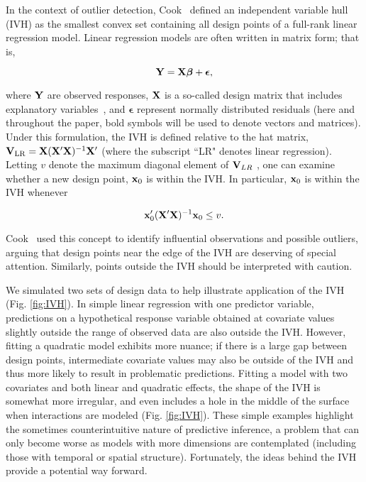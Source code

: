 \documentclass[10pt,letterpaper]{article}
\providecommand{\DIFadd}[1]{{\protect\color{blue}\uwave{#1}}} %
\providecommand{\DIFaddbegin}{} %
\providecommand{\DIFaddend}{} %
\begin{document}
In the context of outlier detection, Cook~\cite{Cook1979} defined an independent variable hull (IVH) as the smallest convex set containing all design points of a full-rank linear regression model.  Linear regression models are often written in matrix form; that is,
\begin{linenomath*}
\begin{equation*}
  {\bf Y} = {\bf X} \boldsymbol{\beta} + \boldsymbol{\epsilon},
\end{equation*}
\end{linenomath*}
where ${\bf Y}$ are observed responses, ${\bf X}$ is a so-called design matrix that includes explanatory variables~\cite{Draper1966}, and $\boldsymbol{\epsilon}$ represent normally distributed residuals (here and throughout the paper, bold symbols will be used to denote vectors and matrices).
Under this formulation, the IVH is defined relative to the hat matrix, ${\bf V}_{\rm LR}={\bf X}({\bf X}^\prime{\bf X})^{-1}{\bf X}^\prime$ (where the subscript ``LR" denotes linear regression).  Letting $v$ denote the maximum diagonal element of ${\bf V}_{LR}$ \DIFaddbegin \DIFadd{(i.e. $v = \max(\textrm{diag}({\bf V}_{LR}))$)}\DIFaddend , one can examine whether a new design point, ${\bf x}_0$ is within the IVH.  In particular, ${\bf x}_0$ is within the IVH whenever
\begin{linenomath*}
\begin{equation}
  \label{eq:IVH}
  {\bf x}_0^\prime ({\bf X}^\prime{\bf X})^{-1}{\bf x}_0 \le v.
\end{equation}
\end{linenomath*}
Cook~\cite{Cook1979} used this concept to identify influential observations and possible outliers, arguing that design points near the edge of the IVH are deserving of special attention.  Similarly, points outside the IVH should be interpreted with caution.

We simulated two sets of design data to help illustrate application of the IVH (Fig. \ref{fig:IVH}).  In simple linear regression with one predictor variable, predictions on a hypothetical response variable obtained at covariate values slightly outside the range of observed data are also outside the IVH.  However, fitting a quadratic model exhibits more nuance; if there is a large gap between design points, intermediate covariate values may also be outside of the IVH and thus more likely to result in problematic predictions.  Fitting a model with two covariates and both linear and quadratic effects, the shape of the IVH is somewhat more irregular, and even includes a hole in the middle of the surface when interactions are modeled (Fig. \ref{fig:IVH}).  These simple examples highlight the sometimes counterintuitive nature of predictive inference, a problem that can only become worse as models with more dimensions are contemplated (including those with temporal or spatial structure).  Fortunately, the ideas behind the IVH provide a potential way forward.
\end{document}
